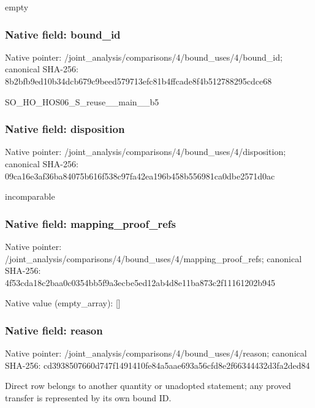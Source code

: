 \documentclass[10pt,a4paper]{article}
\begin{document}
\begingroup\raggedright\sloppy empty\par\endgroup

\subsubsection{Native field: bound\_\allowbreak{}id}
Native pointer: /joint\_\allowbreak{}analysis/comparisons/4/bound\_\allowbreak{}uses/4/bound\_\allowbreak{}id; canonical SHA-256: 8b2bfb9ed10b34dcb679c9beed579713efc81b4ffcade8f4b512788295cdce68

\begingroup\raggedright\sloppy SO\_\allowbreak{}HO\_\allowbreak{}HOS06\_\allowbreak{}S\_\allowbreak{}reuse\_\allowbreak{}\_\allowbreak{}main\_\allowbreak{}\_\allowbreak{}b5\par\endgroup

\subsubsection{Native field: disposition}
Native pointer: /joint\_\allowbreak{}analysis/comparisons/4/bound\_\allowbreak{}uses/4/disposition; canonical SHA-256: 09ca16e3af36ba84075b616f538c97fa42ea196b458b556981ca0dbe2571d0ac

\begingroup\raggedright\sloppy incomparable\par\endgroup

\subsubsection{Native field: mapping\_\allowbreak{}proof\_\allowbreak{}refs}
Native pointer: /joint\_\allowbreak{}analysis/comparisons/4/bound\_\allowbreak{}uses/4/mapping\_\allowbreak{}proof\_\allowbreak{}refs; canonical SHA-256: 4f53cda18c2baa0c0354bb5f9a3ecbe5ed12ab4d8e11ba873c2f11161202b945

Native value (empty\_\allowbreak{}array): []

\subsubsection{Native field: reason}
Native pointer: /joint\_\allowbreak{}analysis/comparisons/4/bound\_\allowbreak{}uses/4/reason; canonical SHA-256: cd3938507660d747f1491410fe84a5aae693a56cfd8e2f66344432d3fa2ded84

\begingroup\raggedright\sloppy Direct row belongs to another quantity or unadopted statement;\allowbreak{} any proved transfer is represented by its own bound ID.\par\endgroup
\end{document}
